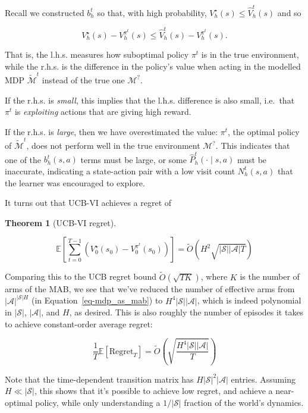 \documentclass[
  letterpaper,
  DIV=11,
  numbers=noendperiod]{scrreprt}
\theoremstyle{plain}
\theoremstyle{plain}
\newtheorem{theorem}{Theorem}[chapter]
\theoremstyle{definition}
\theoremstyle{definition}
\theoremstyle{remark}
\begin{document}
Recall we constructed \(b^t_h\) so that, with high probability,
\(V^\star_h(s) \le \widehat{V}_h^t(s)\) and so

\[V^\star_h(s) - V^{\pi^t}_h(s) \le \widehat{V}_h^t(s) - V^{\pi^t}_h(s).\]

That is, the l.h.s. measures how suboptimal policy \(\pi^t\) is in the
true environment, while the r.h.s. is the difference in the policy's
value when acting in the modelled MDP \(\tilde{\mathcal{M}}^t\) instead
of the true one \(\mathcal{M}^{?}\).

If the r.h.s. is \emph{small}, this implies that the l.h.s. difference
is also small, i.e.~that \(\pi^t\) is \emph{exploiting} actions that are
giving high reward.

If the r.h.s. is \emph{large}, then we have overestimated the value:
\(\pi^t\), the optimal policy of \(\tilde{\mathcal{M}}^t\), does not
perform well in the true environment \(\mathcal{M}^{?}\). This indicates
that one of the \(b_h^t(s, a)\) terms must be large, or some
\(\widehat P^t_h(\cdot \mid s, a)\) must be inaccurate, indicating a
state-action pair with a low visit count \(N^t_h(s, a)\) that the
learner was encouraged to explore.

It turns out that UCB-VI achieves a regret of

\begin{theorem}[UCB-VI
regret]\protect\hypertarget{thm-ucb_vi_regret}{}\label{thm-ucb_vi_regret}

\[\mathbb{E}\left[ \sum_{t=0}^{T-1} \left(V^\star_0(s_0) - V^{\pi^t}_0(s_0) \right) \right] = \tilde{O}(H^2 \sqrt{|\mathcal{S}| |\mathcal{A}| T})\]

\end{theorem}

Comparing this to the UCB regret bound \(\tilde{O}(\sqrt{T K})\), where
\(K\) is the number of arms of the MAB, we see that we've reduced the
number of effective arms from \(|\mathcal{A}|^{|\mathcal{S}|H}\) (in
Equation~\ref{eq-mdp_as_mab}) to \(H^4 |\mathcal{S}||\mathcal{A}|\),
which is indeed polynomial in \(|\mathcal{S}|\), \(|\mathcal{A}|\), and
\(H\), as desired. This is also roughly the number of episodes it takes
to achieve constant-order average regret:

\[\frac{1}{T} \mathbb{E}[\text{Regret}_T] = \tilde{O}\left(\sqrt{\frac{H^4 |\mathcal{S}||\mathcal{A}|}{T}}\right)\]

Note that the time-dependent transition matrix has
\(H |\mathcal{S}|^2 |\mathcal{A}|\) entries. Assuming
\(H \ll |\mathcal{S}|\), this shows that it's possible to achieve low
regret, and achieve a near-optimal policy, while only understanding a
\(1/|\mathcal{S}|\) fraction of the world's dynamics.
\end{document}

